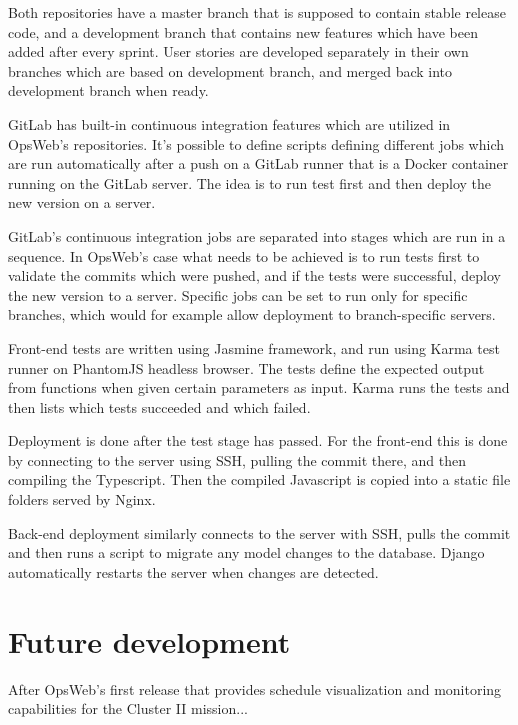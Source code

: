 Both repositories have a master branch that is supposed to contain stable release code, and a development branch that contains new features which have been added after every sprint. User stories are developed separately in their own branches which are based on development branch, and merged back into development branch when ready.

GitLab has built-in continuous integration features which are utilized in OpsWeb's repositories. It's possible to define scripts defining different jobs which are run automatically after a push on a GitLab runner that is a Docker container running on the GitLab server. The idea is to run test first and then deploy the new version on a server.

GitLab's continuous integration jobs are separated into stages which are run in a sequence. In OpsWeb's case what needs to be achieved is to run tests first to validate the commits which were pushed, and if the tests were successful, deploy the new version to a server. Specific jobs can be set to run only for specific branches, which would for example allow deployment to branch-specific servers.

Front-end tests are written using Jasmine framework, and run using Karma test runner on PhantomJS headless browser. The tests define the expected output from functions when given certain parameters as input. Karma runs the tests and then lists which tests succeeded and which failed.

Deployment is done after the test stage has passed. For the front-end this is done by connecting to the server using SSH, pulling the commit there, and then compiling the Typescript. Then the compiled Javascript is copied into a static file folders served by Nginx.

Back-end deployment similarly connects to the server with SSH, pulls the commit and then runs a script to migrate any model changes to the database. Django automatically restarts the server when changes are detected.
\section{Future development}
After OpsWeb's first release that provides schedule visualization and monitoring capabilities for the Cluster II mission...